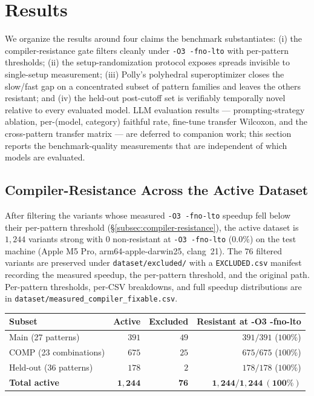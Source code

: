 \section{Results}\label{sec:results}

We organize the results around four claims the benchmark substantiates: (i) the compiler-resistance gate filters cleanly under \texttt{-O3 -fno-lto} with per-pattern thresholds; (ii) the setup-randomization protocol exposes spreads invisible to single-setup measurement; (iii) Polly's polyhedral superoptimizer closes the slow/fast gap on a concentrated subset of pattern families and leaves the others resistant; and (iv) the held-out post-cutoff set is verifiably temporally novel relative to every evaluated model. LLM evaluation results --- prompting-strategy ablation, per-(model, category) faithful rate, fine-tune transfer Wilcoxon, and the cross-pattern transfer matrix --- are deferred to companion work; this section reports the benchmark-quality measurements that are independent of which models are evaluated.

\subsection{Compiler-Resistance Across the Active Dataset}\label{subsec:results-resistance}

After filtering the variants whose measured \texttt{-O3 -fno-lto} speedup fell below their per-pattern threshold (\S\ref{subsec:compiler-resistance}), the active dataset is $1{,}244$ variants strong with $0$ non-resistant at \texttt{-O3 -fno-lto} ($0.0\%$) on the test machine (Apple M5 Pro, arm64-apple-darwin25, clang~21). The $76$ filtered variants are preserved under \texttt{dataset/excluded/} with a \texttt{EXCLUDED.csv} manifest recording the measured speedup, the per-pattern threshold, and the original path. Per-pattern thresholds, per-CSV breakdowns, and full speedup distributions are in \texttt{dataset/measured\_compiler\_fixable.csv}.

\begin{center}
\begin{tabular}{lrrr}
\toprule
\textbf{Subset} & \textbf{Active} & \textbf{Excluded} & \textbf{Resistant at -O3 -fno-lto} \\
\midrule
Main (27 patterns)             & $391$   & $49$ & $391/391$ ($100\%$) \\
COMP (23 combinations)         & $675$   & $25$ & $675/675$ ($100\%$) \\
Held-out (36 patterns)         & $178$   & $2$  & $178/178$ ($100\%$) \\
\midrule
\textbf{Total active}          & $\mathbf{1{,}244}$ & $\mathbf{76}$ & $\mathbf{1{,}244 / 1{,}244\ (100\%)}$ \\
\bottomrule
\end{tabular}
\end{center}


